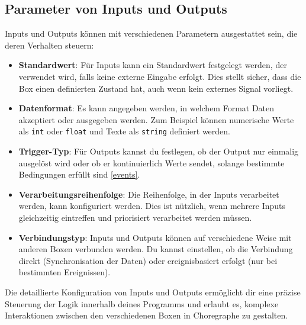 \subsection{Parameter von Inputs und Outputs}
Inputs und Outputs können mit verschiedenen Parametern ausgestattet sein, die deren Verhalten steuern:
\begin{itemize}
    \item \textbf{Standardwert}: Für Inputs kann ein Standardwert festgelegt werden, der verwendet wird, falls keine externe Eingabe erfolgt. Dies stellt sicher, dass die Box einen definierten Zustand hat, auch wenn kein externes Signal vorliegt.
    \item \textbf{Datenformat}: Es kann angegeben werden, in welchem Format Daten akzeptiert oder ausgegeben werden. Zum Beispiel können numerische Werte als \texttt{int} oder \texttt{float} und Texte als \texttt{string} definiert werden.
    \item \textbf{Trigger-Typ}: Für Outputs kannst du festlegen, ob der Output nur einmalig ausgelöst wird oder ob er kontinuierlich Werte sendet, solange bestimmte Bedingungen erfüllt sind \ref{events}.
    \item \textbf{Verarbeitungsreihenfolge}: Die Reihenfolge, in der Inputs verarbeitet werden, kann konfiguriert werden. Dies ist nützlich, wenn mehrere Inputs gleichzeitig eintreffen und priorisiert verarbeitet werden müssen.
    \item \textbf{Verbindungstyp}: Inputs und Outputs können auf verschiedene Weise mit anderen Boxen verbunden werden. Du kannst einstellen, ob die Verbindung direkt (Synchronisation der Daten) oder ereignisbasiert erfolgt (nur bei bestimmten Ereignissen).
\end{itemize}

Die detaillierte Konfiguration von Inputs und Outputs ermöglicht dir eine präzise Steuerung der Logik innerhalb deines Programms und erlaubt es, komplexe Interaktionen zwischen den verschiedenen Boxen in Choregraphe zu gestalten.
